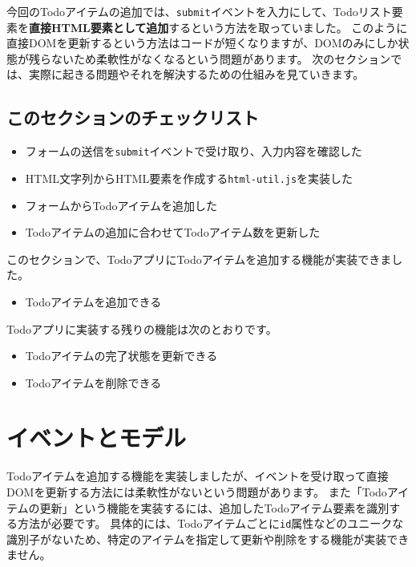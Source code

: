今回のTodoアイテムの追加では、\texttt{submit}イベントを入力にして、Todoリスト要素を\textbf{直接HTML要素として追加}するという方法を取っていました。
このように直接DOMを更新するという方法はコードが短くなりますが、DOMのみにしか状態が残らないため柔軟性がなくなるという問題があります。
次のセクションでは、実際に起きる問題やそれを解決するための仕組みを見ていきます。

\hypertarget{section-checklist}{%
\subsection{このセクションのチェックリスト}\label{section-checklist}}

\begin{itemize}
\item
  フォームの送信を\texttt{submit}イベントで受け取り、入力内容を確認した
\item
  HTML文字列からHTML要素を作成する\texttt{html-util.js}を実装した
\item
  フォームからTodoアイテムを追加した
\item
  Todoアイテムの追加に合わせてTodoアイテム数を更新した
\end{itemize}

このセクションで、TodoアプリにTodoアイテムを追加する機能が実装できました。

\begin{itemize}
\item
  Todoアイテムを追加できる
\end{itemize}

Todoアプリに実装する残りの機能は次のとおりです。

\begin{itemize}
\item
  Todoアイテムの完了状態を更新できる
\item
  Todoアイテムを削除できる
\end{itemize}

\hypertarget{event-model}{%
\section{イベントとモデル}\label{event-model}}

Todoアイテムを追加する機能を実装しましたが、イベントを受け取って直接DOMを更新する方法には柔軟性がないという問題があります。
また「Todoアイテムの更新」という機能を実装するには、追加したTodoアイテム要素を識別する方法が必要です。
具体的には、Todoアイテムごとに\texttt{id}属性などのユニークな識別子がないため、特定のアイテムを指定して更新や削除をする機能が実装できません。

